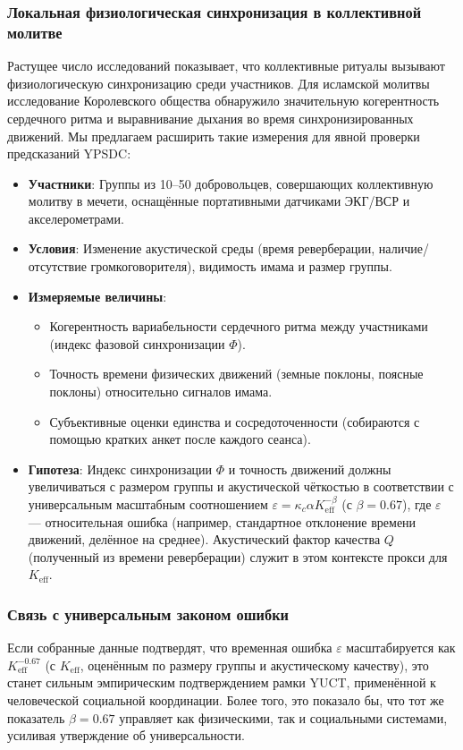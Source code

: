 \documentclass[12pt,a4paper]{article}
\newcommand{\Keff}{K_{\mathrm{eff}}}
\begin{document}
	\subsubsection{Локальная физиологическая синхронизация в коллективной молитве}
	Растущее число исследований показывает, что коллективные ритуалы вызывают физиологическую синхронизацию среди участников. Для исламской молитвы исследование Королевского общества \cite{RoyalSociety2024} обнаружило значительную когерентность сердечного ритма и выравнивание дыхания во время синхронизированных движений. Мы предлагаем расширить такие измерения для явной проверки предсказаний YPSDC:
	
	\begin{itemize}
		\item \textbf{Участники}: Группы из 10–50 добровольцев, совершающих коллективную молитву в мечети, оснащённые портативными датчиками ЭКГ/ВСР и акселерометрами.
		\item \textbf{Условия}: Изменение акустической среды (время реверберации, наличие/отсутствие громкоговорителя), видимость имама и размер группы.
		\item \textbf{Измеряемые величины}:
		\begin{itemize}
			\item Когерентность вариабельности сердечного ритма между участниками (индекс фазовой синхронизации \(\Phi\)).
			\item Точность времени физических движений (земные поклоны, поясные поклоны) относительно сигналов имама.
			\item Субъективные оценки единства и сосредоточенности (собираются с помощью кратких анкет после каждого сеанса).
		\end{itemize}
		\item \textbf{Гипотеза}: Индекс синхронизации \(\Phi\) и точность движений должны увеличиваться с размером группы и акустической чёткостью в соответствии с универсальным масштабным соотношением \(\varepsilon = \kappa_c \alpha \Keff^{-\beta}\) (с \(\beta=0.67\)), где \(\varepsilon\) — относительная ошибка (например, стандартное отклонение времени движений, делённое на среднее). Акустический фактор качества \(Q\) (полученный из времени реверберации) служит в этом контексте прокси для \(\Keff\).
	\end{itemize}
	
	\subsubsection{Связь с универсальным законом ошибки}
	Если собранные данные подтвердят, что временная ошибка \(\varepsilon\) масштабируется как \(\Keff^{-0.67}\) (с \(\Keff\), оценённым по размеру группы и акустическому качеству), это станет сильным эмпирическим подтверждением рамки YUCT, применённой к человеческой социальной координации. Более того, это показало бы, что тот же показатель \(\beta=0.67\) управляет как физическими, так и социальными системами, усиливая утверждение об универсальности.
	
\end{document}
